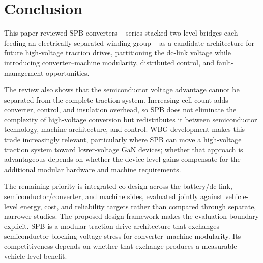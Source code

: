 \section{Conclusion}
\label{sec:conclusion}

This paper reviewed SPB converters --
series-stacked two-level bridges each feeding an electrically
separated winding group -- as a candidate architecture for future
high-voltage traction drives, partitioning the dc-link voltage while
introducing converter--machine modularity, distributed control, and
fault-management opportunities.

The review also shows that the semiconductor voltage advantage cannot
be separated from the complete traction system. Increasing cell count
adds converter, control, and insulation overhead, so SPB does not
eliminate the complexity of high-voltage conversion but redistributes
it between semiconductor technology, machine architecture, and
control. WBG development makes this trade increasingly relevant,
particularly where SPB can move a high-voltage traction system toward
lower-voltage GaN devices; whether that approach is advantageous
depends on whether the device-level gains compensate for the
additional modular hardware and machine requirements.

The remaining priority is integrated co-design across the battery/dc-link,
semiconductor/converter, and machine sides, evaluated jointly against
vehicle-level energy, cost, and reliability targets rather than
compared through separate, narrower studies. The proposed design framework makes the evaluation boundary explicit. SPB is a modular
traction-drive architecture that exchanges semiconductor
blocking-voltage stress for converter--machine modularity. Its
competitiveness depends on whether that exchange produces a measurable
vehicle-level benefit.
